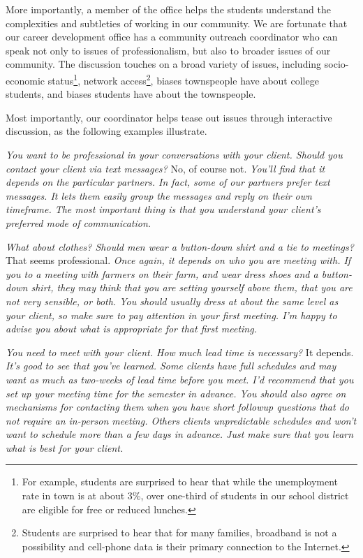 More importantly, a member of the office helps the students understand
the complexities and subtleties of working in our community.  We
are fortunate that our career development office has a community
outreach coordinator who can speak not only to issues of professionalism,
but also to broader issues of our community.  The discussion touches
on a broad variety of issues, including socio-economic status\footnote{For
example, students are surprised to hear that while the unemployment
rate in town is at about 3\%, over one-third of students in our
school district are eligible for free or reduced lunches.}, network
access\footnote{Students are surprised to hear that for many families,
broadband is not a possibility and cell-phone data is their primary
connection to the Internet.}, biases townspeople have about college
students, and biases students have about the townspeople.

Most importantly, our coordinator helps tease out issues through interactive
discussion, as the following examples illustrate.

\newcommand{\question}[1]{\textsl{#1}}
\newcommand{\answer}[1]{#1}
\newcommand{\followup}[1]{\textsl{#1}}

\question{You want to be professional in your conversations with your client.  Should you contact your client via text messages?}
\answer{No, of course not.}
\followup{You'll find that it depends on the particular partners.  In fact, some of our partners prefer text messages.  It lets them easily group the messages and reply on their own timeframe.  The most important thing is that you understand your client's preferred mode of communication.}

\question{What about clothes?  Should men wear a button-down shirt and a tie to meetings?}
\answer{That seems professional.}
\followup{Once again, it depends on who you are meeting with.  If
you to a meeting with farmers on their farm, and wear dress shoes
and a button-down shirt, they may think that you are setting
yourself above them, that you are not very sensible, or both.
You should usually dress at about the same level as your client,
so make sure to pay attention in your first meeting.  I'm happy
to advise you about what is appropriate for that first meeting.}

\question{You need to meet with your client.  How much lead time is necessary?}
\answer{It depends.}
\followup{It's good to see that you've learned.  Some clients have full
schedules and may want as much as two-weeks of lead time before
you meet.  I'd recommend that you set up your meeting time for the
semester in advance.  You should also agree on mechanisms for
contacting them when you have short followup questions that do not
require an in-person meeting.  Others clients unpredictable schedules
and won't want to schedule more than a few days in advance.  Just make
sure that you learn what is best for your client.}

